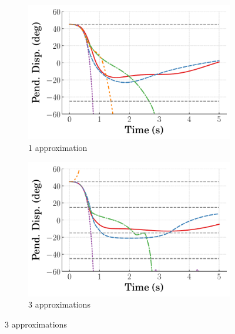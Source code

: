 %
\begin{figure}
    \centering
    \begin{subfigure}[b]{0.32\textwidth}
        \centering
        \includegraphics[width=\textwidth]{figures/figures_Interpretability/Mean_ISE_Inverted_Pendulum-v0_cubic_1_bins_near_equil/Curve_fit_time_responses/pure_RL/curve_fit_Pend_Disp_45.pdf}
        \caption{1 approximation}
        \label{subfig_chap5:pure_RL_near_equil_1_bins_resp_unclipped}
    \end{subfigure}
    \hfill
    \begin{subfigure}[b]{0.32\textwidth}
        \centering
        \includegraphics[width=\textwidth]{figures/figures_Interpretability/Mean_ISE_Inverted_Pendulum-v0_cubic_3_bins_near_equil/Curve_fit_time_responses/pure_RL/curve_fit_Pend_Disp_45.pdf}
        \caption{3 approximations}
        \label{subfig_chap5:pure_RL_near_equil_3_bins_resp_unclipped}

\end{subfigure}
\end{figure}
